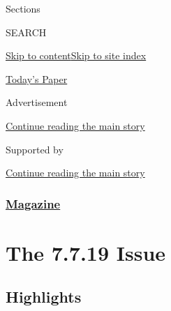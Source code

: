 Sections

SEARCH

\protect\hyperlink{site-content}{Skip to
content}\protect\hyperlink{site-index}{Skip to site index}

\href{https://myaccount.nytimes3xbfgragh.onion/auth/login?response_type=cookie\&client_id=vi}{}

\href{https://www.nytimes3xbfgragh.onion/section/todayspaper}{Today's
Paper}

Advertisement

\protect\hyperlink{after-top}{Continue reading the main story}

Supported by

\protect\hyperlink{after-sponsor}{Continue reading the main story}

\hypertarget{magazine}{%
\subsubsection{\texorpdfstring{\href{/section/magazine}{Magazine}}{Magazine}}\label{magazine}}

\hypertarget{the-7719-issue}{%
\section{The 7.7.19 Issue}\label{the-7719-issue}}

\hypertarget{highlights}{%
\subsection{Highlights}\label{highlights}}

